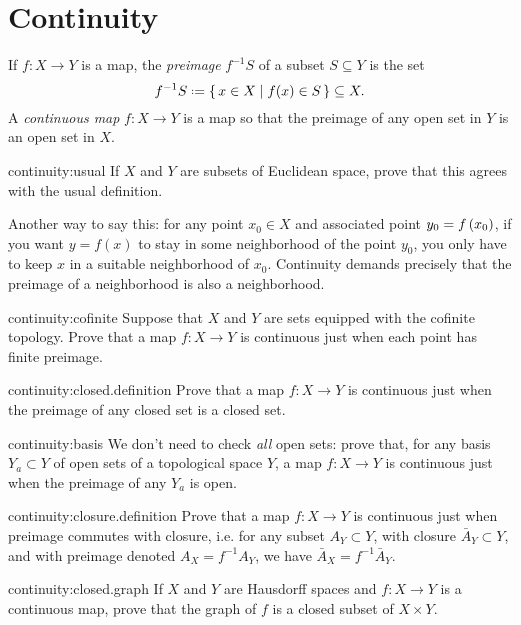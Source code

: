 \chapter{Continuity}\label{chapter:continuity}
If \(f\colon X \to Y\) is a map, the \emph{preimage} \(f^{-1}S\) of a subset \(S\subseteq Y\) is the set 
\[
f^{-1}S\defeq\set{x\in X|f(x)\in S} \subseteq X.
\]
A \emph{continuous map} \(f \colon X \to Y\) is a map so that the preimage of any open set in \(Y\) is an open set in \(X\).
\begin{problem}{continuity:usual}
If \(X\) and \(Y\) are subsets of Euclidean space, prove that this agrees with the usual definition.
\end{problem}
Another way to say this: for any point \(x_0 \in X\) and associated point \(y_0 = f\left(x_0\right)\), if you want \(y=f(x)\) to stay in some neighborhood of the point \(y_0\), you only have to keep \(x\) in a suitable neighborhood of \(x_0\).
Continuity demands precisely that the preimage of a neighborhood is also a neighborhood.
\begin{problem}{continuity:cofinite}
Suppose that \(X\) and \(Y\) are sets equipped with the cofinite topology.
Prove that a map \(f \colon X \to Y\) is continuous just when each point has finite preimage.
\end{problem}
\begin{problem}{continuity:closed.definition}
Prove that a map \(f \colon X \to Y\) is continuous just when the preimage of any closed set is a closed set.
\end{problem}
\begin{problem}{continuity:basis}
We don't need to check \emph{all} open sets: prove that, for any basis \(Y_a \subset Y\) of open sets of a topological space \(Y\), a map \(f \colon X \to Y\) is continuous just when the preimage of any \(Y_a\) is open.
\end{problem}
\begin{problem}{continuity:closure.definition}
Prove that a map \(f \colon X \to Y\) is continuous just when preimage commutes with closure, i.e. for any subset \(A_Y \subset Y\), with closure \(\bar{A}_Y \subset Y\), and with preimage denoted \(A_X=f^{-1}A_Y\), we have \(\bar{A}_X=f^{-1}\bar{A}_Y\).
\end{problem}
\begin{problem*}{continuity:closed.graph}
If \(X\) and \(Y\) are Hausdorff spaces and \(f \colon X \to Y\) is a continuous map, prove that the graph of \(f\) is a closed subset of \(X \times Y\).
\end{problem*}
